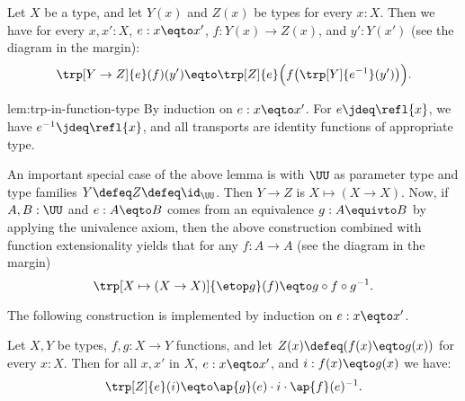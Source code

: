 \begin{construction}\label{lem:trp-in-function-type}
Let $X$ be a type, and let $Y(x)$ and $Z(x)$ be types for every $x:X$.
Then we have for every $x,x':X$, $e: x \eqto x'$, $f: Y(x)\to Z(x)$, and $y':Y(x')$ (see the diagram in the margin):%
\[
\trp[Y\to Z]{e}(f)(y') \eqto \trp[Z]{e} \Bigl(f\bigl(\trp[Y]{e^{-1}}(y')\bigr)\Bigr).
\]
\end{construction}
\begin{implementation}{lem:trp-in-function-type}
By induction on $e: x \eqto x'$. For $e \jdeq \refl{x}$, we have $e^{-1}\jdeq \refl{x}$,
and all transports are identity functions of appropriate type.
\end{implementation}

An important special case of the above lemma is with $\UU$
as parameter type and type families $Y\defeq Z\defeq \id_\UU$.
Then $Y\to Z$ is $X \mapsto (X\to X)$. Now,
if $A,B:\UU$ and $e: A \eqto B$ comes from an equivalence $g:A\equivto B$
by applying the univalence axiom,
then the above construction combined with function extensionality
yields that for any $f: A\to A$ (see the diagram in the margin)
\[
\trp[X \mapsto (X\to X)]{\etop g} (f) \eqto g\circ f \circ g^{-1}.
\]

The following construction is implemented by induction on $e: x \eqto x'$.

\begin{construction}\label{lem:trp-in-fx=Ygx}
Let $X,Y$ be types, $f,g: X\to Y$ functions, and let
$Z(x)\defeq (f(x) \eqto g(x))$ for every $x:X$.
Then for all $x,x'$ in $X$, $e: x \eqto x'$, and $i: f(x) \eqto g(x)$ we have:
\[
\trp[Z]{ e} (i) \eqto \ap{g}(e) \cdot i \cdot \ap{f}(e)^{-1}.
\]
\end{construction}

